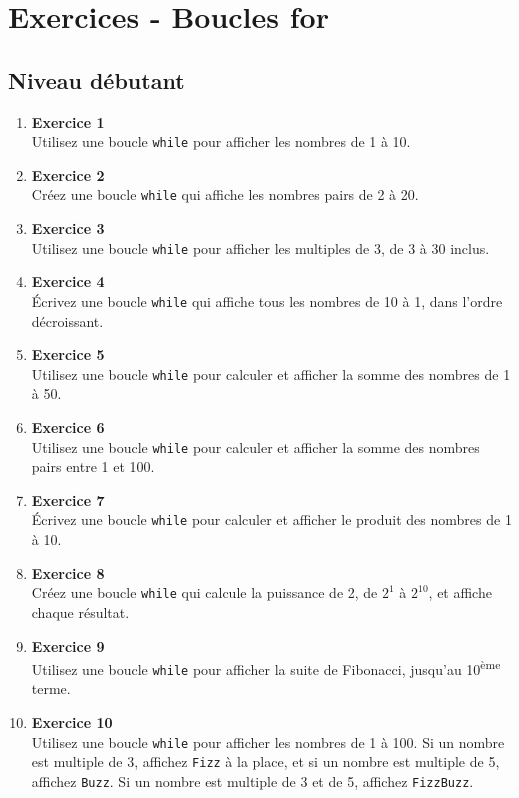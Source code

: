 

\section*{Exercices - Boucles for}
\subsection{Niveau débutant}
\begin{enumerate}

    \item \textbf{Exercice 1} \\
    Utilisez une boucle \texttt{while} pour afficher les nombres de 1 à 10.

    \item \textbf{Exercice 2} \\
    Créez une boucle \texttt{while} qui affiche les nombres pairs de 2 à 20.

    \item \textbf{Exercice 3} \\
    Utilisez une boucle \texttt{while} pour afficher les multiples de 3, de 3 à 30 inclus.

    \item \textbf{Exercice 4} \\
    Écrivez une boucle \texttt{while} qui affiche tous les nombres de 10 à 1, dans l'ordre décroissant.

    \item \textbf{Exercice 5} \\
    Utilisez une boucle \texttt{while} pour calculer et afficher la somme des nombres de 1 à 50.

    \item \textbf{Exercice 6} \\
    Utilisez une boucle \texttt{while} pour calculer et afficher la somme des nombres pairs entre 1 et 100.

    \item \textbf{Exercice 7} \\
    Écrivez une boucle \texttt{while} pour calculer et afficher le produit des nombres de 1 à 10.

    \item \textbf{Exercice 8} \\
    Créez une boucle \texttt{while} qui calcule la puissance de 2, de \(2^1\) à \(2^{10}\), et affiche chaque résultat.

    \item \textbf{Exercice 9} \\
    Utilisez une boucle \texttt{while} pour afficher la suite de Fibonacci, jusqu'au 10\textsuperscript{ème} terme.

    \item \textbf{Exercice 10} \\
    Utilisez une boucle \texttt{while} pour afficher les nombres de 1 à 100. Si un nombre est multiple de 3, affichez \texttt{Fizz} à la place, et si un nombre est multiple de 5, affichez \texttt{Buzz}. Si un nombre est multiple de 3 et de 5, affichez \texttt{FizzBuzz}.

\end{enumerate}
